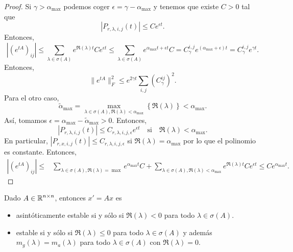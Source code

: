 \begin{proof}
Si $\displaystyle \gamma > \alpha_{\max } $ podemos coger $\displaystyle \epsilon = \gamma - \alpha_{\max } $ y tenemos que existe $\displaystyle C > 0 $ tal que 
\[ \left|P_{r, \lambda, i,j}\left(t\right)\right|\leq Ce^{\epsilon t} .\]
Entonces, 
\[ \left|\left(e^{tA}\right)_{ij}\right|\leq \sum_{\lambda \in \sigma\left(A\right)}e^{\Re\left(\lambda \right)t}Ce^{\epsilon t} \leq \sum_{\lambda \in \sigma\left(A\right)}e^{\alpha_{\max }t + \epsilon t}C = C_{\gamma }^{i,j}e^{\left(\alpha_{\max }+\epsilon \right)t}=C^{i,j}_{\gamma }e^{\gamma t} .\]
Entonces, 
\[\|e^{tA}\|^{2}_{F}\leq e^{2\gamma t}\sum_{i,j}\left(C_{\gamma }^{ij}\right)^{2} .\]
Para el otro caso, 
\[\tilde{\alpha}_{\max }=\max_{\lambda \in \sigma \left(A\right), \Re\left(\lambda \right)<\alpha_{\max }} \left\{ \Re\left(\lambda \right)\right\} < \alpha_{\max } .\]
Así, tomamos $\displaystyle \epsilon = \alpha_{\max }-\tilde{\alpha}_{\max } > 0 $. Entonces, 
\[ \left|P_{r,\lambda, i,j}\left(t\right)\right|\leq C_{r,\lambda,i,j,\epsilon }e^{\epsilon t}\quad \text{si} \quad \Re\left(\lambda \right)< \alpha_{\max } .\]
En particular, $\displaystyle \left|P_{r,x,i,j}\left(t\right)\right|\leq C_{r,\lambda,i,j,\epsilon } $ si $\displaystyle \Re\left(\lambda \right)=\alpha_{\max } $ por lo que el polinomio es constante. Entonces, 
\[
\begin{split}
	\left|\left(e^{tA}\right)_{ij}\right| \leq & \sum_{\lambda \in \sigma\left(A\right), \Re\left(\lambda \right)=\max }e^{\alpha_{\max }t}C + \sum_{ \lambda \in \sigma\left(A\right), \Re\left(\lambda \right)< \alpha_{\max }}e^{\Re\left(\lambda \right)t}Ce^{\epsilon t} 
	\leq  Ce^{\alpha_{\max }t}.
\end{split}
\]
\end{proof}
\begin{theorem}
Dado $\displaystyle A \in \mathbb{R}^{n \times n} $, entonces $\displaystyle x' = Ax $ es
\begin{itemize}
\item asintóticamente estable si y sólo si $\displaystyle \Re\left(\lambda \right)<0 $ para todo $\displaystyle \lambda \in \sigma\left(A\right) $. 
\item estable si y sólo si $\displaystyle \Re\left(\lambda \right)\leq 0 $ para todo $\displaystyle \lambda \in \sigma\left(A\right) $ y además $\displaystyle m_{g}\left(\lambda \right)=m_{a}\left(\lambda \right) $ para todo $\displaystyle \lambda \in \sigma \left(A\right) $ con $\displaystyle \Re\left(\lambda \right)=0 $. 
\end{itemize}
\end{theorem}
